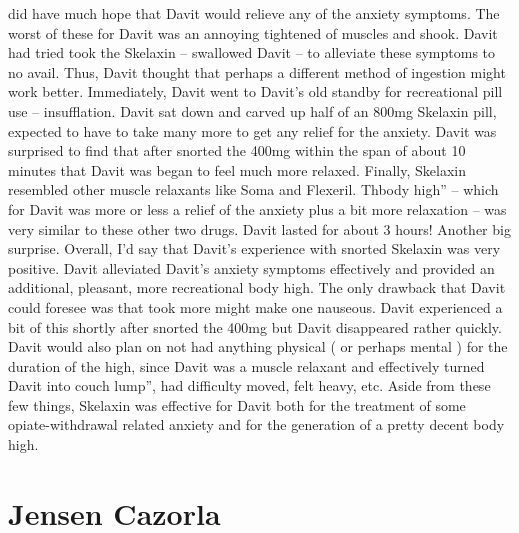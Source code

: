 \documentclass[12pt]{book}
\begin{document}
did have much hope that Davit would relieve any of the anxiety symptoms. The worst of these for Davit was an annoying tightened of muscles and shook. Davit had tried took the Skelaxin -- swallowed Davit -- to alleviate these symptoms to no avail. Thus, Davit thought that perhaps a different method of ingestion might work better. Immediately, Davit went to Davit's old standby for recreational pill use -- insufflation. Davit sat down and carved up half of an 800mg Skelaxin pill, expected to have to take many more to get any relief for the anxiety. Davit was surprised to find that after snorted the 400mg within the span of about 10 minutes that Davit was began to feel much more relaxed. Finally, Skelaxin resembled other muscle relaxants like Soma and Flexeril. Thbody high'' -- which for Davit was more or less a relief of the anxiety plus a bit more relaxation -- was very similar to these other two drugs. Davit lasted for about 3 hours! Another big surprise. Overall, I'd say that Davit's experience with snorted Skelaxin was very positive. Davit alleviated Davit's anxiety symptoms effectively and provided an additional, pleasant, more recreational body high. The only drawback that Davit could foresee was that took more might make one nauseous. Davit experienced a bit of this shortly after snorted the 400mg but Davit disappeared rather quickly. Davit would also plan on not had anything physical ( or perhaps mental ) for the duration of the high, since Davit was a muscle relaxant and effectively turned Davit into couch lump'', had difficulty moved, felt heavy, etc. Aside from these few things, Skelaxin was effective for Davit both for the treatment of some opiate-withdrawal related anxiety and for the generation of a pretty decent body high.



\chapter{Jensen Cazorla}
\end{document}
